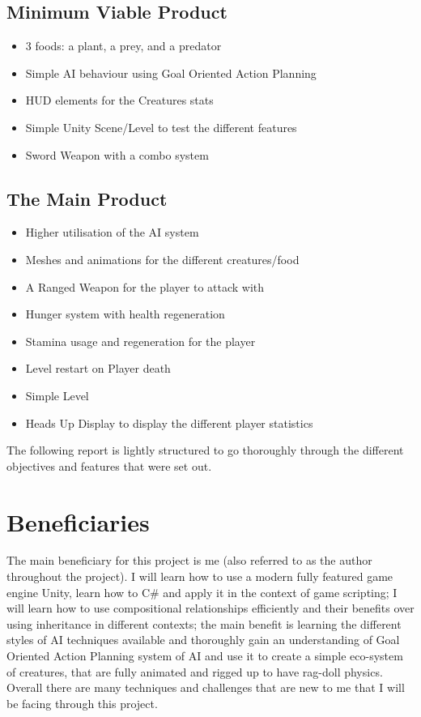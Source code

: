 \documentclass[11pt]{report}
\begin{document}
\subsection{Minimum Viable Product}
\begin{itemize}
    \item 3 foods: a plant, a prey, and a predator
    \item Simple AI behaviour using Goal Oriented Action Planning
    \item HUD elements for the Creatures stats
    \item Simple Unity Scene/Level to test the different features
    \item Sword Weapon with a combo system
\end{itemize}
\subsection{The Main Product}
\begin{itemize}
    \item Higher utilisation of the AI system
    \item Meshes and animations for the different creatures/food
    \item A Ranged Weapon for the player to attack with
    \item Hunger system with health regeneration
    \item Stamina usage and regeneration for the player
    \item Level restart on Player death
    \item Simple Level
    \item Heads Up Display to display the different player statistics
\end{itemize}
The following report is lightly structured to go thoroughly through the different objectives and features that were set out.


\section{Beneficiaries}
The main beneficiary for this project is me (also referred to as the author throughout the project). I will learn how to use a modern fully featured game engine Unity, learn how to C\# and apply it in the context of game scripting; I will learn how to use compositional relationships efficiently and their benefits over using inheritance in different contexts; the main benefit is learning the different styles of AI techniques available and thoroughly gain an understanding of Goal Oriented Action Planning system of AI and use it to create a simple eco-system of creatures, that are fully animated and rigged up to have rag-doll physics. Overall there are many techniques and challenges that are new to me that I will be facing through this project. 
\end{document}
